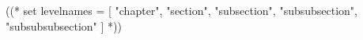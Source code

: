 ((* set levelnames = [
        "chapter",
        "section",
        "subsection",
        "subsubsection",
        "subsubsubsection" ] *))
